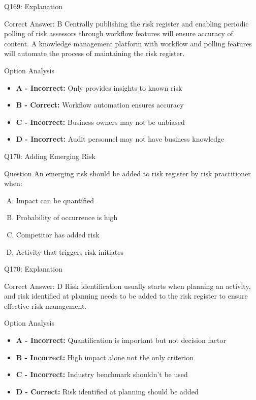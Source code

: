 \documentclass{beamer}
\begin{document}
	\begin{frame}{Q169: Explanation}
		\begin{block}{Correct Answer: B}
			Centrally publishing the risk register and enabling periodic polling of risk assessors through workflow features will ensure accuracy of content. A knowledge management platform with workflow and polling features will automate the process of maintaining the risk register.
		\end{block}
		\begin{block}{Option Analysis}
			\begin{itemize}
				\item \textbf{A - Incorrect:} Only provides insights to known risk
				\item \textbf{B - Correct:} Workflow automation ensures accuracy
				\item \textbf{C - Incorrect:} Business owners may not be unbiased
				\item \textbf{D - Incorrect:} Audit personnel may not have business knowledge
			\end{itemize}
		\end{block}
	\end{frame}
	
	\begin{frame}{Q170: Adding Emerging Risk}
		\begin{block}{Question}
			An emerging risk should be added to risk register by risk practitioner when:
		\end{block}
		\begin{enumerate}[(A)]
			\item Impact can be quantified
			\item Probability of occurrence is high
			\item Competitor has added risk
			\item Activity that triggers risk initiates
		\end{enumerate}
	\end{frame}
	
	\begin{frame}{Q170: Explanation}
		\begin{block}{Correct Answer: D}
			Risk identification usually starts when planning an activity, and risk identified at planning needs to be added to the risk register to ensure effective risk management.
		\end{block}
		\begin{block}{Option Analysis}
			\begin{itemize}
				\item \textbf{A - Incorrect:} Quantification is important but not decision factor
				\item \textbf{B - Incorrect:} High impact alone not the only criterion
				\item \textbf{C - Incorrect:} Industry benchmark shouldn't be used
				\item \textbf{D - Correct:} Risk identified at planning should be added
			\end{itemize}
		\end{block}
	\end{frame}
	
\end{document}
